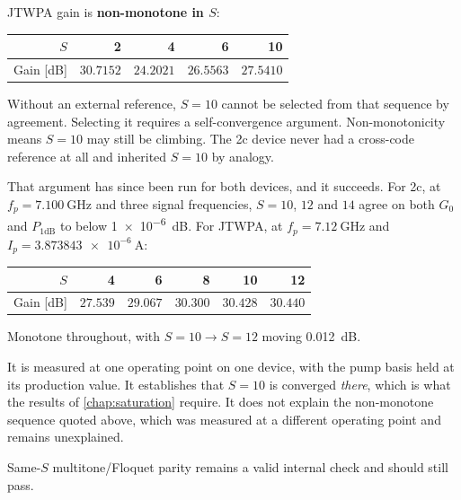 \begin{caveat}
JTWPA gain is \textbf{non-monotone in $S$}:
\begin{center}
\begin{tabular}{@{}r r r r r@{}}
\toprule
$S$ & 2 & 4 & 6 & 10 \\
\midrule
Gain [\si{\dB}] & $30.7152$ & $24.2021$ & $26.5563$ & $27.5410$ \\
\bottomrule
\end{tabular}
\end{center}
Without an external reference, $S=10$ cannot be selected from that sequence by
agreement. Selecting it requires a self-convergence argument. Non-monotonicity
means $S=10$ may still be climbing. The 2c device never had a cross-code
reference at all and inherited $S=10$ by analogy.
\end{caveat}

That argument has since been run for both devices, and it succeeds. For 2c, at
$f_p = \SI{7.100}{\giga\hertz}$ and three signal frequencies, $S=10$, $12$ and
$14$ agree on both $G_0$ and $P_{1\mathrm{dB}}$ to below \SI{1e-6}{\dB}. For
JTWPA, at $f_p = \SI{7.12}{\giga\hertz}$ and
$I_p = \SI{3.873843e-6}{\ampere}$:

\begin{measured}
\begin{center}
\begin{tabular}{@{}r r r r r r@{}}
\toprule
$S$ & 4 & 6 & 8 & 10 & 12 \\
\midrule
Gain [\si{\dB}] & $27.539$ & $29.067$ & $30.300$ & $30.428$ & $30.440$ \\
\bottomrule
\end{tabular}
\end{center}
Monotone throughout, with $S=10 \to S=12$ moving \SI{0.012}{\dB}.
\end{measured}

\begin{caveat}
It is measured at one operating point on one device, with the pump basis held
at its production value. It establishes that $S=10$ is converged \emph{there},
which is what the results of \cref{chap:saturation} require. It does not explain
the non-monotone sequence quoted above, which was measured at a different
operating point and remains unexplained.

Same-$S$ multitone/Floquet parity remains a valid internal check and should
still pass.
\end{caveat}

